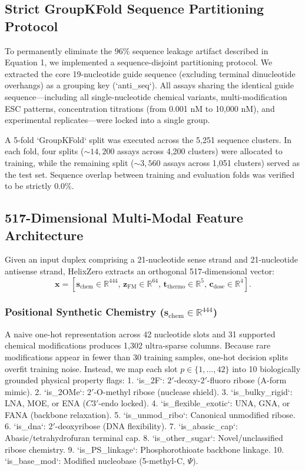 \documentclass[twocolumn]{article}
\begin{document}
\subsection{Strict GroupKFold Sequence Partitioning Protocol}
To permanently eliminate the $96\%$ sequence leakage artifact described in Equation 1, we implemented a sequence-disjoint partitioning protocol. We extracted the core 19-nucleotide guide sequence (excluding terminal dinucleotide overhangs) as a grouping key (`anti\_seq`). All assays sharing the identical guide sequence---including all single-nucleotide chemical variants, multi-modification ESC patterns, concentration titrations (from 0.001 nM to 10,000 nM), and experimental replicates---were locked into a single group.

A 5-fold `GroupKFold` split was executed across the 5,251 sequence clusters. In each fold, four splits ($\sim 14{,}200$ assays across 4,200 clusters) were allocated to training, while the remaining split ($\sim 3{,}560$ assays across 1,051 clusters) served as the test set. Sequence overlap between training and evaluation folds was verified to be strictly $0.0\%$.

\subsection{517-Dimensional Multi-Modal Feature Architecture}
Given an input duplex comprising a 21-nucleotide sense strand and 21-nucleotide antisense strand, HelixZero extracts an orthogonal 517-dimensional vector:
\begin{equation}
\mathbf{x} = [\mathbf{s}_{\text{chem}} \in \mathbb{R}^{444}, \, \mathbf{z}_{\text{FM}} \in \mathbb{R}^{64}, \, \mathbf{t}_{\text{thermo}} \in \mathbb{R}^5, \, \mathbf{c}_{\text{dose}} \in \mathbb{R}^4].
\end{equation}

\subsubsection{Positional Synthetic Chemistry ($\mathbf{s}_{\text{chem}} \in \mathbb{R}^{444}$)}
A naive one-hot representation across 42 nucleotide slots and 31 supported chemical modifications produces 1,302 ultra-sparse columns. Because rare modifications appear in fewer than 30 training samples, one-hot decision splits overfit training noise. Instead, we map each slot $p \in \{1, \dots, 42\}$ into 10 biologically grounded physical property flags:
1. `is\_2F`: $2'$-deoxy-$2'$-fluoro ribose (A-form mimic).
2. `is\_2OMe`: $2'$-O-methyl ribose (nuclease shield).
3. `is\_bulky\_rigid`: LNA, MOE, or ENA ($C3'$-endo locked).
4. `is\_flexible\_exotic`: UNA, GNA, or FANA (backbone relaxation).
5. `is\_unmod\_ribo`: Canonical unmodified ribose.
6. `is\_dna`: $2'$-deoxyribose (DNA flexibility).
7. `is\_abasic\_cap`: Abasic/tetrahydrofuran terminal cap.
8. `is\_other\_sugar`: Novel/unclassified ribose chemistry.
9. `is\_PS\_linkage`: Phosphorothioate backbone linkage.
10. `is\_base\_mod`: Modified nucleobase (5-methyl-C, $\Psi$).
\end{document}
